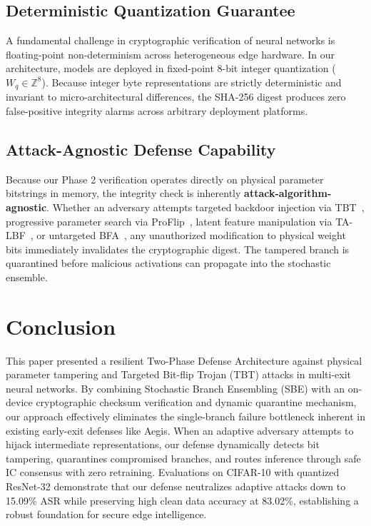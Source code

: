 \documentclass[conference,10pt]{IEEEtran}
\begin{document}
\subsection{Deterministic Quantization Guarantee}
A fundamental challenge in cryptographic verification of neural networks is floating-point non-determinism across heterogeneous edge hardware. In our architecture, models are deployed in fixed-point 8-bit integer quantization ($W_q \in \mathbb{Z}^8$). Because integer byte representations are strictly deterministic and invariant to micro-architectural differences, the SHA-256 digest produces zero false-positive integrity alarms across arbitrary deployment platforms.

\subsection{Attack-Agnostic Defense Capability}
Because our Phase 2 verification operates directly on physical parameter bitstrings in memory, the integrity check is inherently \textbf{attack-algorithm-agnostic}. Whether an adversary attempts targeted backdoor injection via TBT~\cite{rakin2020tbt}, progressive parameter search via ProFlip~\cite{chen2021proflip}, latent feature manipulation via TA-LBF~\cite{bai2021talbf}, or untargeted BFA~\cite{rakin2019bfa}, any unauthorized modification to physical weight bits immediately invalidates the cryptographic digest. The tampered branch is quarantined before malicious activations can propagate into the stochastic ensemble.


\section{Conclusion}
This paper presented a resilient Two-Phase Defense Architecture against physical parameter tampering and Targeted Bit-flip Trojan (TBT) attacks in multi-exit neural networks. By combining Stochastic Branch Ensembling (SBE) with an on-device cryptographic checksum verification and dynamic quarantine mechanism, our approach effectively eliminates the single-branch failure bottleneck inherent in existing early-exit defenses like Aegis. When an adaptive adversary attempts to hijack intermediate representations, our defense dynamically detects bit tampering, quarantines compromised branches, and routes inference through safe IC consensus with zero retraining. Evaluations on CIFAR-10 with quantized ResNet-32 demonstrate that our defense neutralizes adaptive attacks down to 15.09\% ASR while preserving high clean data accuracy at 83.02\%, establishing a robust foundation for secure edge intelligence.
\end{document}
